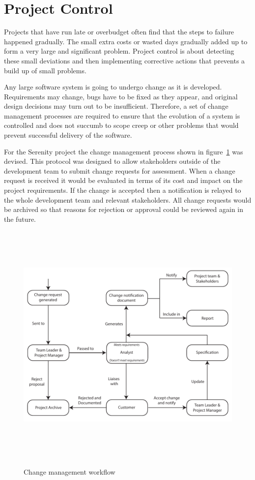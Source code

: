 \section{Project Control}
\label{sec:control}


Projects that have run late or overbudget often find that the steps to failure happened gradually.
The small extra costs or wasted days gradually added up to form a very large and significant
problem. Project control is about detecting these small deviations and then implementing corrective
actions that prevents a build up of small problems.

Any large software system is going to undergo change as it is developed. Requirements may change,
bugs have to be fixed as they appear, and original design decisions may turn out to be insufficient.
Therefore, a set of change management processes are required to ensure that the evolution of a
system is controlled and does not succumb to scope creep or other problems that would prevent
successful delivery of the software.

For the Serenity project the change management process shown in figure~\ref{fig:change_management}
was devised. This protocol was designed to allow stakeholders outside of the development team
to submit change requests for assessment. When a change request is received it would be evaluated
in terms of its cost and impact on the project requirements. If the change is accepted then a
notification is relayed to the whole development team and relevant stakeholders. All change requests
would be archived so that reasons for rejection or approval could be reviewed again in the future.

\begin{figure}
	\includegraphics[height=33em]{res/change_management_diagram}
	\label{fig:change_management}
	\caption{Change management workflow}
\end{figure}

